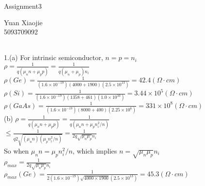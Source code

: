 \documentclass[11pt,oneside,a4paper]{article}
\begin{document}
\begin{center}Assignment3\\\end{center}
\begin{flushright}Yuan Xiaojie\\5093709092\\\end{flushright}

\ \\

1.\:(a) For intrinsic semiconductor, \(n=p=n_i\) \\

\hspace{8.5mm} \(\rho=\frac{1}{q(\mu_nn+\mu_pp)}=\frac{1}{q(\mu_n+\mu_p)n_i}\) \\

\hspace{8.5mm} \(\rho(Ge)=\frac{1}{(1.6\times10^{-19})(4000+1900)(2.5\times10^{13})}=42.4 (\Omega\cdot cm)\) \\

\hspace{8.5mm} \(\rho(Si)=\frac{1}{(1.6\times10^{-19})(1358+461)(1.0\times10^{10})}=3.44\times10^5 (\Omega\cdot cm)\) \\

\hspace{8.5mm} \(\rho(GaAs)=\frac{1}{(1.6\times10^{-19})(8000+400)(2.25\times10^6)}=331\times10^8 (\Omega\cdot cm)\) \\

\quad (b) \(\rho=\frac{1}{q(\mu_nn+\mu_pp)}=\frac{1}{q(\mu_nn+\mu_pn_i^2/n)}\) \\

\hspace{8.5mm}\quad \(\leq\frac{1}{q2\sqrt{(\mu_nn)(\mu_pn_i^2/n)}}=\frac{1}{2q\sqrt{\mu_n\mu_p}n_i}\) \\

\hspace{8.5mm} So when \(\mu_nn=\mu_pn_i^2/n\), which implies \(n=\sqrt{\mu_n\mu_p}n_i\) \\

\hspace{8.5mm} \(\rho_{max}=\frac{1}{2q\sqrt{\mu_n\mu_p}n_i}\) \\

\hspace{8.5mm} \(\rho_{max}(Ge)=\frac{1}{2(1.6\times10^{-19})\sqrt{4000\times1900}(2.5\times10^{13})}=45.3 (\Omega\cdot cm)\) \\
\end{document}
